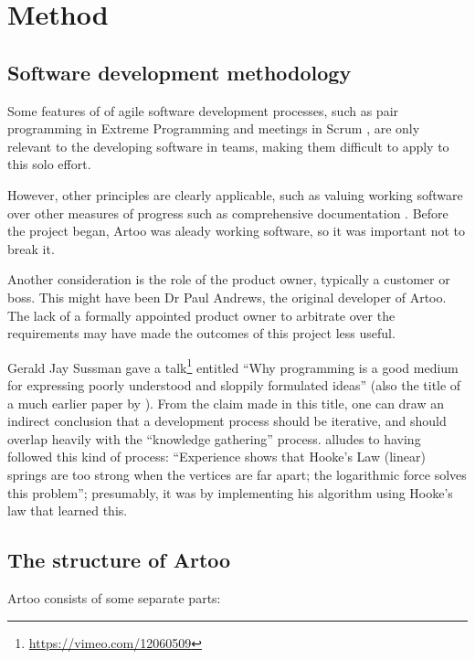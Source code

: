 \chapter{Method}

\section{Software development methodology}

Some features of of agile software development processes, such as pair programming in Extreme Programming \cite{xpparr} and meetings in Scrum \cite{schwaber2004agile}, are only relevant to the developing software in teams, making them difficult to apply to this solo effort.

However, other principles are clearly applicable, such as valuing working software over other measures of progress such as comprehensive documentation \cite{schwaber2004agile}. Before the project began, Artoo was aleady working software, so it was important not to break it.

Another consideration is the role of the product owner, typically a customer or boss. This might have been Dr Paul Andrews, the original developer of Artoo. The lack of a formally appointed product owner to arbitrate over the requirements may have made the outcomes of this project less useful.

Gerald Jay Sussman gave a talk\footnote{\url{https://vimeo.com/12060509}} entitled ``Why programming is a good medium for expressing poorly understood and sloppily formulated ideas'' (also the title of a much earlier paper by \citet{67poorslop}).
From the claim made in this title, one can draw an indirect conclusion that a development process should be iterative, and should overlap heavily with the ``knowledge gathering'' process.
\citet{eades84} alludes to having followed this kind of process: ``Experience
shows that Hooke's Law (linear) springs are too strong when the vertices are far
apart; the logarithmic force solves this problem''; presumably, it was by implementing his algorithm using Hooke's law that \citeauthor{eades84} learned this.


\section{The structure of Artoo}

Artoo consists of some separate parts:

